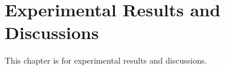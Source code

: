 \fancyhead[RE]{\fontsize{8}{12}\selectfont\leftmark}
\chapter{Experimental Results and Discussions}
\label{pwork1}


This chapter is for experimental results and discussions.












